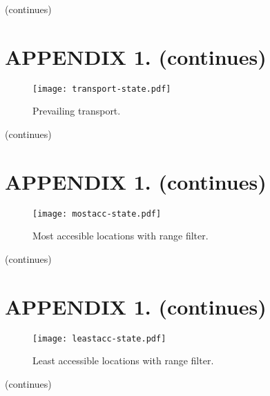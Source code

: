 \vfill
\begin{flushright}
  (continues)
\end{flushright}

\section*{APPENDIX 1. (continues)}

\vfill

\begin{figure}[ht]
  \centering
  \captionsetup{justification=centering,margin=0.2cm}
  \texttt{[image: transport-state.pdf]}
  \caption{Prevailing transport.}
  \label{pic:transportstate}
\end{figure}

\vfill
\begin{flushright}
  (continues)
\end{flushright}

\section*{APPENDIX 1. (continues)}

\vfill

\begin{figure}[ht]
  \centering
  \captionsetup{justification=centering,margin=0.2cm}
  \texttt{[image: mostacc-state.pdf]}
  \caption{Most accesible locations with range filter.}
  \label{pic:mostaccstate}
\end{figure}

\vfill
\begin{flushright}
  (continues)
\end{flushright}

\section*{APPENDIX 1. (continues)}

\vfill

\begin{figure}[ht]
  \centering
  \captionsetup{justification=centering,margin=0.2cm}
  \texttt{[image: leastacc-state.pdf]}
  \caption{Least accessible locations with range filter.}
  \label{pic:leastaccstate}
\end{figure}

\vfill
\begin{flushright}
  (continues)
\end{flushright}

